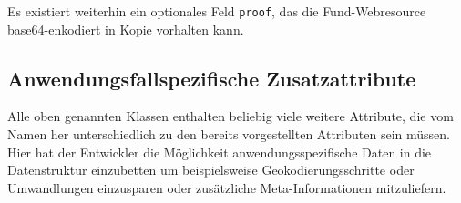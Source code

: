 Es existiert weiterhin ein optionales Feld \texttt{proof}, das die Fund-Webresource base64-enkodiert in Kopie vorhalten kann.

\subsection{Anwendungsfallspezifische Zusatzattribute}

Alle oben genannten Klassen enthalten beliebig viele weitere Attribute, die vom Namen her unterschiedlich zu den bereits vorgestellten Attributen sein müssen. Hier hat der Entwickler die Möglichkeit anwendungsspezifische Daten in die Datenstruktur einzubetten um beispielsweise Geokodierungsschritte oder Umwandlungen einzusparen oder zusätzliche Meta-Informationen mitzuliefern.

